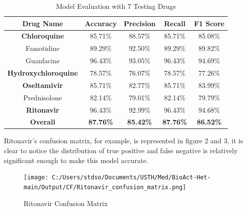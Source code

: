 \documentclass[conference]{IEEEtran}
\begin{document}
\begin{table}[h!]
  \centering
  \caption{Model Evaluation with 7 Testing Drugs}
  \label{table:evaluation}
  \begin{tabular}{|c|c|c|c|c|}
    \hline
    \rowcolor{headercolor}
    \textbf{Drug Name}          & \textbf{Accuracy} & \textbf{Precision} & \textbf{   Recall   } & \textbf{F1 Score} \\ \hline
    \rowcolor{rowcolor}
    \textbf{Chloroquine}        & 85.71\%           & 88.57\%            & 85.71\%               & 85.08\%           \\ \hline
    Famotidine                  & 89.29\%           & 92.50\%            & 89.29\%               & 89.82\%           \\ \hline
    Guanfacine                  & 96.43\%           & 93.05\%            & 96.43\%               & 94.69\%           \\ \hline
    \rowcolor{rowcolor}
    \textbf{Hydroxychloroquine} & 78.57\%           & 76.07\%            & 78.57\%               & 77.26\%           \\ \hline
    \rowcolor{rowcolor}
    \textbf{Oseltamivir}        & 85.71\%           & 82.77\%            & 85.71\%               & 83.99\%           \\ \hline
    Prednisolone                & 82.14\%           & 79.01\%            & 82.14\%               & 79.79\%           \\ \hline
    \rowcolor{rowcolor}
    \textbf{Ritonavir}          & 96.43\%           & 92.99\%            & 96.43\%               & 94.68\%           \\ \hline
    \rowcolor{overallcolor}
    \textbf{Overall}            & \textbf{87.76\%}  & \textbf{85.42\%}   & \textbf{87.76\%}      & \textbf{86.52\%}  \\ \hline
  \end{tabular}
\end{table}

Ritonavir’s confusion matrix, for example, is represented in figure 2 and 3, it is clear to notice the distribution of true positive and false negative is relatively significant enough to make this model accurate.\\

\begin{figure}[htbp]
  \centering
  \texttt{[image: C:/Users/stdso/Documents/USTH/Med/BioAct-Het-main/Output/CF/Ritonavir\_confusion\_matrix.png]}
  \caption{Ritonavir Confusion Matrix}
  \label{fig:Ritonavir Confusion Matrix}
\end{figure}
\end{document}
